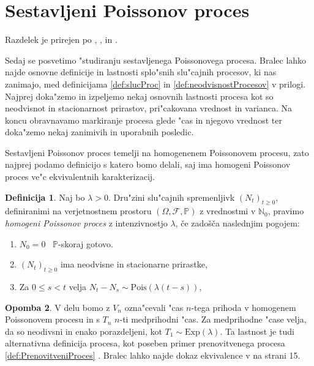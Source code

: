\documentclass[12pt, a4paper, reqno]{amsart}
\theoremstyle{definition}
\newtheorem{definicija}{Definicija}[section]
\newtheorem{opomba}[definicija]{Opomba}
\theoremstyle{plain}
\newcommand{\N}{\mathbb{N}}
\newcommand{\Prob}{\mathbb{P}}
\newcommand{\1}{\mathds{1}}
\newcommand{\Pois}[1]{\text{Pois}(#1)}
\newcommand*{\refPriloga}[1]{%
  \begingroup
    \hypersetup{
      linkcolor=red,
      linkbordercolor=red,
    }%
    \ref{#1}%
  \endgroup
}
\begin{document}
    \newpage


\section{Sestavljeni Poissonov proces}

    \noindent
    Razdelek je prirejen po \cite{1}, \cite{2}, in \cite{3}.

    Sedaj se posvetimo "studiranju sestavljenega Poissonovega procesa. Bralec lahko najde 
    osnovne definicije in lastnosti splo"snih slu"cajnih procesov, ki nas zanimajo, 
     med definicijama \refPriloga{def:slucProc} in \refPriloga{def:neodvisnostProcesov} v prilogi.
    Najprej doka"zemo in izpeljemo nekaj osnovnih lastnosti procesa kot so neodvisnot in stacionarnost
    prirastov, pri"cakovana vrednost in varianca. Na koncu obravnavamo markiranje procesa glede "cas in 
    njegovo vrednost ter doka"zemo nekaj zanimivih in uporabnih posledic.

    Sestavljeni Poissonov proces temelji na homogenenem Poissonovem procesu, zato najprej podamo definicijo 
    s katero bomo delali, saj ima homogeni Poissonov proces ve"c ekvivalentnih karakterizacij. 

    \begin{definicija}
        Naj bo $\lambda > 0$. Dru"zini slu"cajnih spremenljivk $(N_t)_{t\geq 0}$, definiranimi na verjetnostnem 
        prostoru $(\Omega, \mathcal{F}, \mathbb{P})$ z vrednostmi v $\N_0$, pravimo 
        \textit{homogeni Poissonov proces} z intenzivnostjo $\lambda$, če zadošča naslednjim pogojem:
        \begin{enumerate}
            \item $N_0 = 0$ \ $\Prob$-skoraj gotovo.
            \item $(N_t)_{t\geq 0}$ ima neodvisne in stacionarne prirastke,
            \item Za $0 \leq s < t$ velja $ N_t - N_s \sim\Pois{\lambda(t - s)}$,
        \end{enumerate}
        \label{def:HPP}
    \end{definicija}

    \begin{opomba}
    V delu bomo z $V_n$ ozna"cevali "cas $n$-tega prihoda v homogenem Poissonovem procesu in s $T_n$ $n$-ti 
    medprihodni "cas. Za medprihodne "case velja, da so neodivsni in enako porazdeljeni, kot 
    $T_1 \sim \text{Exp}(\lambda)$. Ta lastnost je tudi alternativna definicija procesa, kot poseben 
    primer prenovitvenega procesa \refPriloga{def:PrenovitveniProces}. Bralec 
    lahko najde dokaz ekvivalence v \cite{10} na strani 15.
    \end{opomba}
\end{document}
